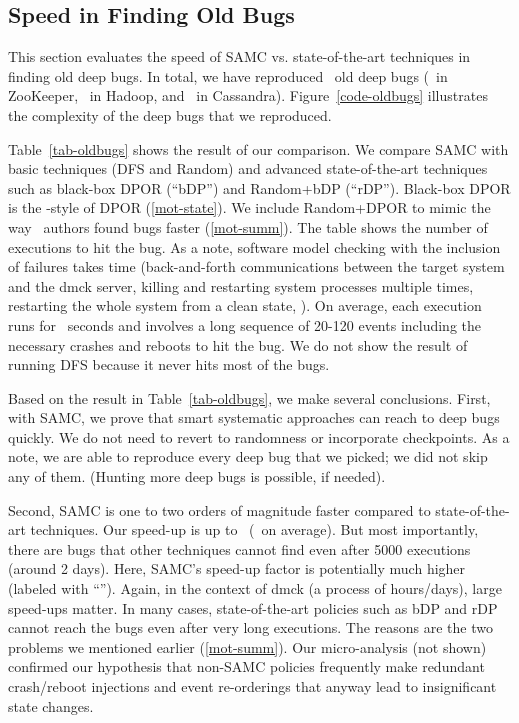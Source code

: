 


\subsection{Speed in Finding Old Bugs}
\label{eval-oldbugs}






This section evaluates the speed of SAMC vs. state-of-the-art
techniques in finding old deep bugs.  In total, we have reproduced
\numOldDeepBugs\ old deep bugs (\numZkDeepBugs\ in ZooKeeper,
\numMrDeepBugs\ in Hadoop, and \numCsDeepBugs\ in Cassandra).
Figure~\ref{code-oldbugs} illustrates the complexity of the deep bugs
that we reproduced.



Table~\ref{tab-oldbugs} shows the result of our comparison.  We
compare SAMC with basic techniques (DFS and Random) and advanced
state-of-the-art techniques such as black-box DPOR (``bDP'') and
Random+bDP (``rDP'').  Black-box DPOR is the \modist-style of DPOR
(\sec\ref{mot-state}).  We include Random+DPOR to mimic the way
\modist\ authors found bugs faster (\sec\ref{mot-summ}).  The table
shows the number of executions to hit the bug.  As a note,
software model checking with the inclusion of failures
takes time (back-and-forth communications between the target system
and the dmck server, killing and restarting system processes multiple
times, restarting the whole system from a clean state, \etc).  On
average, each execution runs for \numAvgExecTime\ seconds and involves
a long sequence of 20-120 events including the necessary crashes and
reboots to hit the bug.  We do not show the result of running DFS
because it never hits most of the bugs.  


Based on the result in Table~\ref{tab-oldbugs}, we make several
conclusions.
%
First, with SAMC, we prove that smart systematic approaches can reach
to deep bugs quickly.  We do not need to revert to randomness or
incorporate checkpoints.  As a note, we are able to reproduce every
deep bug that we picked; we did not skip any of them.
%
(Hunting more deep bugs is possible, if needed).

Second, SAMC is one to two orders of magnitude faster compared to
state-of-the-art techniques.  Our speed-up is up to
\numMaxBugSpeedUp\ (\numAvgBugSpeedUp\ on average).  But most
importantly, there are bugs that other techniques cannot find even
after 5000 executions (around 2 days). Here, SAMC's speed-up factor is
potentially much higher (labeled with ``\uu'').  Again, in the context of
dmck (a process of hours/days), large speed-ups matter.  In many
cases, state-of-the-art policies such as bDP and rDP cannot reach the
bugs even after very long executions.  The reasons are the two
problems we mentioned earlier (\sec\ref{mot-summ}).  Our
micro-analysis (not shown) confirmed our hypothesis that non-SAMC
policies frequently make redundant crash/reboot injections and event
re-orderings that anyway lead to insignificant state changes.

